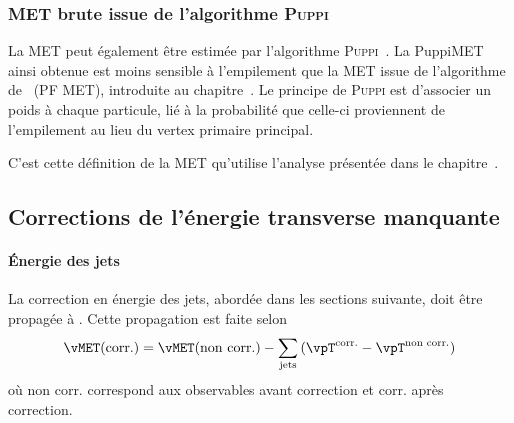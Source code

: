 \subsubsection{MET brute issue de l'algorithme \textsc{Puppi}}
La MET peut également être estimée par l'algorithme \textsc{Puppi}~\cite{PUPPI}.
La \og PuppiMET \fg{} ainsi obtenue est moins sensible à l'empilement que la MET issue de l'algorithme de \PF\ (PF MET), introduite au chapitre~.
Le principe de \textsc{Puppi} est d'associer un poids à chaque particule, lié à la probabilité que celle-ci proviennent de l'empilement au lieu du vertex primaire principal.


C'est cette définition de la MET qu'utilise l'analyse présentée dans le chapitre~.
\subsection{Corrections de l'énergie transverse manquante}
\paragraph{Énergie des jets}
La correction en énergie des jets, abordée dans les sections suivante, doit être propagée à \MET.
Cette propagation est faite selon
\begin{equation}
\vMET(\text{corr.}) = \vMET(\text{non corr.}) - \sum_\text{jets} \left( \vpT^\text{corr.} - \vpT^\text{non corr.} \right)
\end{equation}
où
\og non corr. \fg{} correspond aux observables avant correction
et
\og corr. \fg{} après correction.
